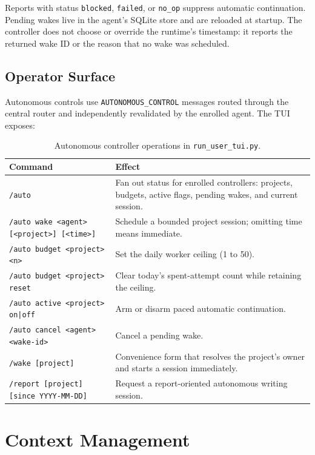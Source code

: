 \documentclass[11pt,letterpaper]{report}
\newcommand{\code}[1]{\texttt{#1}}
\begin{document}
Reports with status \code{blocked}, \code{failed}, or \code{no\_op} suppress
automatic continuation. Pending wakes live in the agent's SQLite store and
are reloaded at startup. The controller does not choose or override the
runtime's timestamp: it reports the returned wake ID or the reason that no
wake was scheduled.

\section{Operator Surface}

Autonomous controls use \code{AUTONOMOUS\_CONTROL} messages routed through
the central router and independently revalidated by the enrolled agent. The
TUI exposes:

\begin{table}[h]
\centering
\small
\begin{tabular}{@{}lL{8cm}@{}}
\toprule
\textbf{Command} & \textbf{Effect} \\
\midrule
\code{/auto} & Fan out status for enrolled controllers: projects, budgets,
  active flags, pending wakes, and current session. \\
\code{/auto wake <agent> [<project>] [<time>]} & Schedule a bounded project
  session; omitting time means immediate. \\
\code{/auto budget <project> <n>} & Set the daily worker ceiling (1 to 50). \\
\code{/auto budget <project> reset} & Clear today's spent-attempt count while
  retaining the ceiling. \\
\code{/auto active <project> on|off} & Arm or disarm paced automatic
  continuation. \\
\code{/auto cancel <agent> <wake-id>} & Cancel a pending wake. \\
\code{/wake [project]} & Convenience form that resolves the project's owner
  and starts a session immediately. \\
\code{/report [project] [since YYYY-MM-DD]} & Request a report-oriented
  autonomous writing session. \\
\bottomrule
\end{tabular}
\caption{Autonomous controller operations in \code{run\_user\_tui.py}.}
\label{tab:auto-commands}
\end{table}


\chapter{Context Management}
\label{ch:context}
\end{document}
